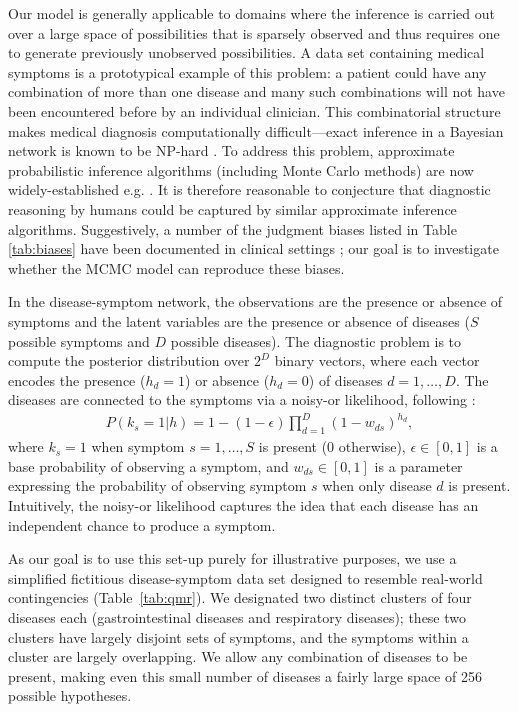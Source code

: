 Our model is generally applicable to domains where the inference is carried out over a large space of possibilities that is sparsely observed and thus requires one to generate previously unobserved possibilities. A data set containing medical symptoms is a prototypical example of this problem: a patient could have any combination of more than one disease and many such combinations will not have been encountered before by an individual clinician. This combinatorial structure makes medical diagnosis computationally difficult---exact inference in a Bayesian network is known to be NP-hard \citep{cooper1990complexity}. To address this problem, approximate probabilistic inference algorithms (including Monte Carlo methods) are now widely-established e.g. \citet{Shwe1991, Jaakkola1999, Heckerman1990}. It is therefore reasonable to conjecture that diagnostic reasoning by humans could be captured by similar approximate inference algorithms. Suggestively, a number of the judgment biases listed in Table \ref{tab:biases} have been documented in clinical settings \citep{redelmeier1995probability,elstein1978medical,weber1993}; our goal is to investigate whether the MCMC model can reproduce these biases.

In the disease-symptom network, the observations are the presence or absence of symptoms and the latent variables are the presence or absence of diseases ($S$ possible symptoms and $D$ possible diseases). The diagnostic problem is to compute the posterior distribution over $2^D$ binary vectors, where each vector encodes the presence ($h_d=1$) or absence ($h_d=0$) of diseases $d = 1,\ldots,D$. The diseases are connected to the symptoms via a noisy-or likelihood, following \cite{shwe1991probabilistic}:
\begin{align}
P(k_s = 1|h) = 1 - (1-\epsilon) \prod_{d=1}^D (1-w_{ds})^{h_d},
\end{align}
where $k_s = 1$ when symptom $s = 1, \ldots, S$ is present (0 otherwise), $\epsilon \in [0,1]$ is a base probability of observing a symptom, and $w_{ds} \in [0,1]$ is a parameter expressing the probability of observing symptom $s$ when only disease $d$ is present. Intuitively, the noisy-or likelihood captures the idea that each disease has an independent chance to produce a symptom.

As our goal is to use this set-up purely for illustrative purposes, we use a simplified fictitious disease-symptom data set designed to resemble real-world contingencies (Table~\ref{tab:qmr}). We designated two distinct clusters of four diseases each (gastrointestinal diseases and respiratory diseases); these two clusters have largely disjoint sets of symptoms, and the symptoms within a cluster are largely overlapping. We allow any combination of diseases to be present, making even this small number of diseases a fairly large space of 256 possible hypotheses.

